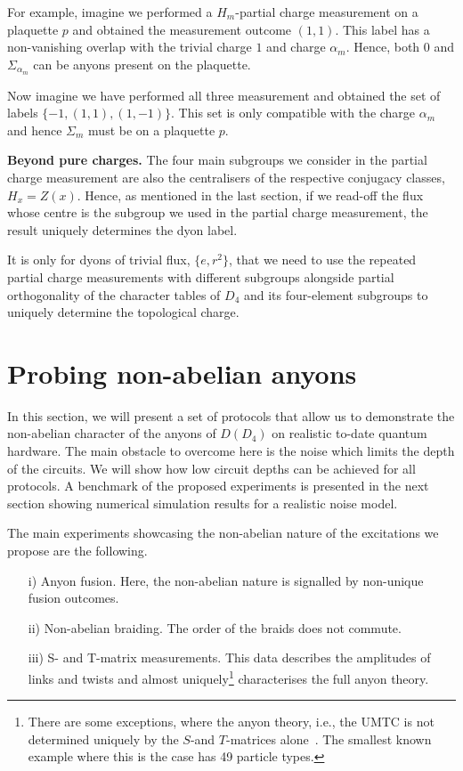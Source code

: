 \documentclass[a4paper,twocolumn,11pt]{quantumarticle}
\begin{document}
For example, imagine we performed a $H_m$-partial charge measurement on a plaquette $p$ and obtained the measurement outcome $(1,1)$. This label has a non-vanishing overlap with the trivial charge $1$ and charge $\alpha_m$. Hence, both $0$ and $\Sigma_{\alpha_m}$ can be anyons present on the plaquette.

Now imagine we have performed all three measurement and obtained the set of labels $\{-1, (1, 1), (1, -1)\}$. This set is only compatible with the charge $\alpha_m$ and hence $\Sigma_m$ must be on a plaquette $p$.

\textbf{Beyond pure charges.} The four main subgroups we consider in the partial charge measurement are also the centralisers of the respective conjugacy classes, $H_x = Z(x)$. Hence, as mentioned in the last section, if we read-off the flux whose centre is the subgroup we used in the partial charge measurement, the result uniquely determines the dyon label.

It is only for dyons of trivial flux, $\{e, r^2\}$, that we need to use the repeated partial charge measurements with different subgroups alongside partial orthogonality of the character tables of $D_4$ and its four-element subgroups to uniquely determine the topological charge.

\section{Probing non-abelian anyons} \label{sec:probing}

In this section, we will present a set of protocols that allow us to demonstrate the non-abelian character of the anyons of $D(D_4)$ on realistic to-date quantum hardware. The main obstacle to overcome here is the noise which limits the depth of the circuits. We will show how low circuit depths can be achieved for all protocols. A benchmark of the proposed experiments is presented in the next section showing numerical simulation results for a realistic noise model.


The main experiments showcasing the non-abelian nature of the excitations we propose are the following.
\begin{itemize}

\item[i)] Anyon fusion. Here, the non-abelian nature is signalled by non-unique fusion outcomes.

\item[ii)] Non-abelian braiding. The order of the braids does not commute.

\item[iii)] S- and T-matrix measurements. This data describes the amplitudes of links and twists and almost uniquely\footnote{There are some exceptions, where the anyon theory, i.e., the UMTC is not determined uniquely by the $S$-and $T$-matrices alone~\cite{notdetermined2021}. The smallest known example where this is the case has 49 particle types.} characterises the full anyon theory.
\end{itemize}
\end{document}
